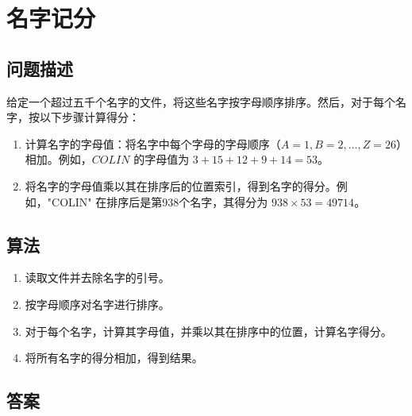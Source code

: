 \section{名字记分}
\subsection{问题描述}
\begin{tcolorbox}

给定一个超过五千个名字的文件，将这些名字按字母顺序排序。然后，对于每个名字，按以下步骤计算得分：

\begin{enumerate}
    \item 计算名字的字母值：将名字中每个字母的字母顺序（$A=1, B=2, ..., Z=26$）相加。例如，$COLIN$ 的字母值为 $3 + 15 + 12 + 9 + 14 = 53$。
    \item 将名字的字母值乘以其在排序后的位置索引，得到名字的得分。例如，"COLIN" 在排序后是第938个名字，其得分为 $938 \times 53 = 49714$。
\end{enumerate}
\end{tcolorbox}

\subsection{算法}
\begin{enumerate}
    \item 读取文件并去除名字的引号。
    \item 按字母顺序对名字进行排序。
    \item 对于每个名字，计算其字母值，并乘以其在排序中的位置，计算名字得分。
    \item 将所有名字的得分相加，得到结果。
\end{enumerate}

\subsection{答案}

